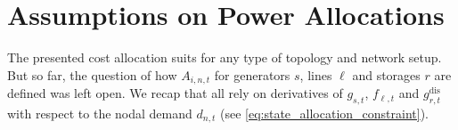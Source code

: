 \documentclass[11pt,twocolumn]{article}
\newcommand{\generation}{g_{s,t}}
\newcommand{\flow}{f_{\ell,t}}
\newcommand{\storage}{g_{r,t}}
\newcommand{\storagedispatch}{\storage^\text{dis}}
\newcommand{\demand}[1][n]{d_{#1,t}}
\newcommand{\allocatestate}[1][i, n]{A_{#1,t}}
\begin{document}
\section{Assumptions on Power Allocations}
\label{sec:localizing_allocations}

The presented cost allocation suits for any type of topology and network setup. But so far, the question of how $\allocatestate$ for generators $s$, lines $\ell$ and storages $r$ are defined was left open. We recap that all rely on derivatives of $\generation$, $\flow$ and $\storagedispatch$  with respect to the nodal demand $\demand$ (see \cref{eq:state_allocation_constraint}). \\
\end{document}
